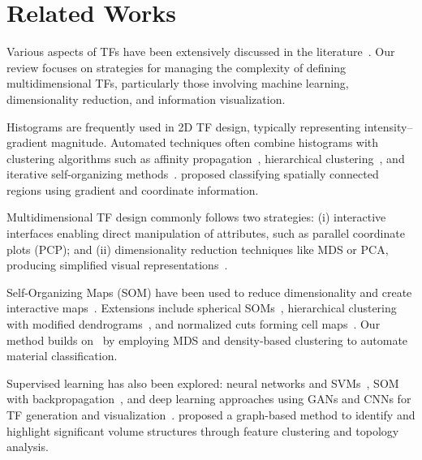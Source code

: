 \section{Related Works}
\label{sect:related-works}

Various aspects of TFs have been extensively discussed in the literature~\cite{ljung2016}. Our review focuses on strategies for managing the complexity of defining multidimensional TFs, particularly those involving machine learning, dimensionality reduction, and information visualization.

Histograms are frequently used in 2D TF design, typically representing intensity--gradient magnitude. Automated techniques often combine histograms with clustering algorithms such as affinity propagation~\cite{zhang2016}, hierarchical clustering~\cite{sereda2006}, and iterative self-organizing methods~\cite{tzeng2004}. \citet{roettger2005} proposed classifying spatially connected regions using gradient and coordinate information.

Multidimensional TF design commonly follows two strategies: (i) interactive interfaces enabling direct manipulation of attributes, such as parallel coordinate plots (PCP); and (ii) dimensionality reduction techniques like MDS or PCA, producing simplified visual representations~\cite{tory2005, zhao2010, guo2011}.

Self-Organizing Maps (SOM) have been used to reduce dimensionality and create interactive maps~\cite{moura2007}. Extensions include spherical SOMs~\cite{khan2015}, hierarchical clustering with modified dendrograms~\cite{wang2011}, and normalized cuts forming cell maps~\cite{cai2017}. Our method builds on~\cite{cai2017} by employing MDS and density-based clustering to automate material classification.

Supervised learning has also been explored: neural networks and SVMs~\cite{tzeng2005}, SOM with backpropagation~\cite{wang2006}, and deep learning approaches using GANs and CNNs for TF generation and visualization~\cite{berger2018, hong2019, kim2021, pan2024}. \citet{sharma2020} proposed a graph-based method to identify and highlight significant volume structures through feature clustering and topology analysis.
